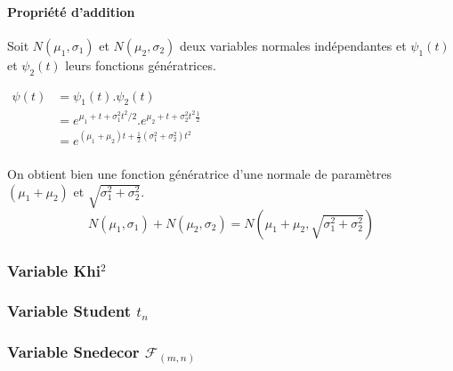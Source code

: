 \paragraph{Propriété d'addition}\label{propriete-normale-addition}
Soit $N(\mu_1,\sigma_1)$ et $N(\mu_2,\sigma_2)$ deux variables normales indépendantes et $\psi_1(t)$ et $\psi_2(t)$ leurs fonctions génératrices.
\begin{center}
$\begin{array}{LL}
\psi(t) &= \psi_1(t).\psi_2(t)\\
        &= e^{\mu_1+t+\sigma_1^2t^2/2}.e^{\mu_2+t+\sigma_2^2t^2\frac{1}{2}}\\
        &= e^{(\mu_1+\mu_2)t+\frac{1}{2}(\sigma_1^2+\sigma_2^2)t^2}\\
\end{array}$
\end{center}
On obtient bien une fonction génératrice d'une normale de paramètres $(\mu_1+\mu_2)$ et $\sqrt{\sigma_1^2+\sigma_2^2}$.
$$\boxed{N(\mu_1,\sigma_1) + N(\mu_2,\sigma_2) = N\left(\mu_1+\mu_2,\sqrt{\sigma_1^2+\sigma_2^2}\right)}$$







\subsubsection{Variable Khi$^2$}
\subsubsection{Variable Student $t_n$}
\label{propriete-student}
\subsubsection{Variable Snedecor $\mathcal{F}_{(m,n)}$}


